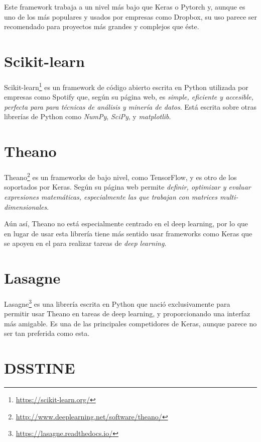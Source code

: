 \bigskip

Este framework trabaja a un nivel más bajo que Keras o Pytorch y, aunque es uno de los más populares y usados por empresas como Dropbox, su uso parece ser recomendado para proyectos más grandes y complejos que éste.

\section{Scikit-learn}

Scikit-learn\footnote{\url{https://scikit-learn.org/}} es un framework de código abierto escrita en Python utilizada por empresas como Spotify que, según su página web, es \textit{simple, eficiente y accesible, perfecta para para técnicas de análisis y minería de datos}. Está escrita sobre otras librerías de Python como \textit{NumPy}, \textit{SciPy}, y \textit{matplotlib}.

\section{Theano}

Theano\footnote{\url{http://www.deeplearning.net/software/theano/}} es un frameworks de bajo nivel, como TensorFlow, y es otro de los soportados por Keras. Según su página web permite \textit{definir, optimizar y evaluar expresiones matemáticas, especialmente las que trabajan con matrices multi-dimensionales}.

\bigskip

Aún así, Theano no está especialmente centrado en el deep learning, por lo que en lugar de usar esta librería tiene más sentido usar frameworks como Keras que se apoyen en el para realizar tareas de \textit{deep learning}.

\section{Lasagne}

Lasagne\footnote{\url{https://lasagne.readthedocs.io/}} es una librería escrita en Python que nació exclusivamente para permitir usar Theano en tareas de deep learning, y proporcionando una interfaz más amigable. Es una de las principales competidores de Keras, aunque parece no ser tan preferida como esta.

\section{DSSTINE}

